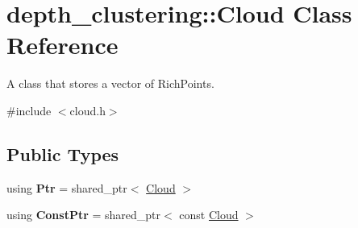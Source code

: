 \hypertarget{classdepth__clustering_1_1Cloud}{\section{depth\-\_\-clustering\-:\-:Cloud Class Reference}
\label{classdepth__clustering_1_1Cloud}
}


A class that stores a vector of Rich\-Points.  




{\ttfamily \#include $<$cloud.\-h$>$}

\subsection*{Public Types}
\begin{DoxyCompactItemize}
\item 
\hypertarget{classdepth__clustering_1_1Cloud_a6357719aeeb7c05cbd4a375f63526ba1}{using {\bfseries Ptr} = shared\-\_\-ptr$<$ \hyperlink{classdepth__clustering_1_1Cloud}{Cloud} $>$}\label{classdepth__clustering_1_1Cloud_a6357719aeeb7c05cbd4a375f63526ba1}

\item 
\hypertarget{classdepth__clustering_1_1Cloud_ae8ba86a4493a06d04e25cba4e97b9787}{using {\bfseries Const\-Ptr} = shared\-\_\-ptr$<$ const \hyperlink{classdepth__clustering_1_1Cloud}{Cloud} $>$}\label{classdepth__clustering_1_1Cloud_ae8ba86a4493a06d04e25cba4e97b9787}

\end{DoxyCompactItemize}
